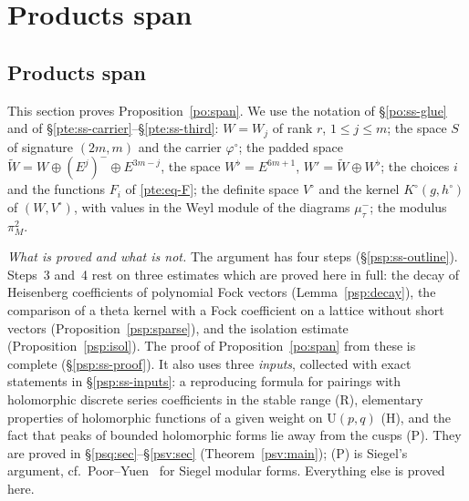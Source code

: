 \documentclass[10pt]{amsart}
\theoremstyle{definition}
\theoremstyle{remark}
\providecommand{\psvac}{\mathbf v}
\begin{document}
\section{Products span}\label{C2:g4}
\providecommand{\auO}{\mathcal O}
\providecommand{\auU}{\mathrm U}
\providecommand{\auGL}{\mathrm{GL}}
\providecommand{\auHom}{\operatorname{Hom}}
\providecommand{\auA}{\mathbb A}
\providecommand{\auPl}{\Phi}
\providecommand{\aubar}[1]{\overline{#1}}
\providecommand{\poA}{\mathcal A}
\providecommand{\pcMat}{\mathrm M}
\providecommand{\psvac}{{\phi^{\mathrm{vac}}}}
\providecommand{\pspF}{\mathfrak F}
\providecommand{\pspl}{\lambda}
\providecommand{\pspn}{n_*}
\providecommand{\pspm}{\mathsf m}
\providecommand{\pspip}[2]{\langle #1,#2\rangle}
\providecommand{\pspG}{G_\infty}

\subsection{Products span}\label{psp:sec}

This section proves Proposition~\ref{po:span}. We use the notation of \S\ref{po:ss-glue} and of
\S\ref{pte:ss-carrier}--\S\ref{pte:ss-third}: $W=W_j$ of rank $r$, $1\le j\le m$; the space $S$ of
signature $(2m,m)$ and the carrier $\varphi^\circ$; the padded space $\widetilde W=W\oplus(E^j)^-\oplus
E^{3m-j}$, the space $W^\flat=E^{6m+1}$, $W'=\widetilde W\oplus W^\flat$; the choices $i$ and the
functions $F_i$ of \eqref{pte:eq-F}; the definite space $V^\circ$ and the kernel $K^\circ(g,h^\circ)$ of
$(W,V^\circ)$, with values in the Weyl module of the diagrams $\mu^-_\tau$; the modulus $\pi_M^2$.

\emph{What is proved and what is not.} The argument has four steps (\S\ref{psp:ss-outline}). Steps~3
and~4 rest on three estimates which are proved here in full: the decay of Heisenberg coefficients
of polynomial Fock vectors (Lemma~\ref{psp:decay}), the comparison of a theta kernel with a Fock
coefficient on a lattice without short vectors (Proposition~\ref{psp:sparse}), and the isolation
estimate (Proposition~\ref{psp:isol}). The proof of Proposition~\ref{po:span} from these is complete
(\S\ref{psp:ss-proof}). It also uses three \emph{inputs}, collected with exact statements in
\S\ref{psp:ss-inputs}: a reproducing formula for pairings with holomorphic discrete series
coefficients in the stable range (R), elementary properties of holomorphic functions of a given
weight on $\auU(p,q)$ (H), and the fact that peaks of bounded holomorphic forms lie away from the
cusps (P). They are proved in \S\ref{psq:sec}--\S\ref{psv:sec} (Theorem~\ref{psv:main}); (P) is
Siegel's argument, cf.\ Poor--Yuen~\cite{PoorYuen} for Siegel modular forms. Everything else is proved
here.
\end{document}
